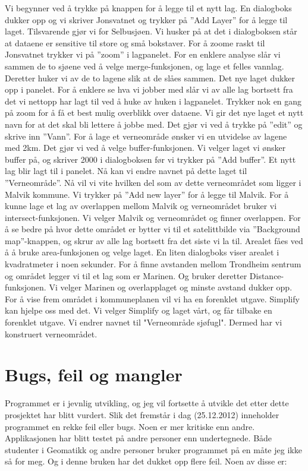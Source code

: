 \documentclass[12pt,twoside,onecolumn]{article}
\begin{document}
	Vi begynner ved å trykke på knappen for å legge til et nytt lag. En dialogboks dukker opp og vi skriver Jonsvatnet og trykker på ''Add Layer'' for å legge til laget. Tilsvarende gjør vi for Selbusjøen. Vi husker på at det i dialogboksen står at dataene er sensitive til store og små bokstaver. For å zoome raskt til Jonsvatnet trykker vi på ''zoom'' i lagpanelet. For en enklere analyse slår vi sammen de to sjøene ved å velge merge-funksjonen, og lage et felles vannlag. Deretter huker vi av de to lagene slik at de slåes sammen. Det nye laget dukker opp i panelet. For å enklere se hva vi jobber med slår vi av alle lag bortsett fra det vi nettopp har lagt til ved å huke av huken i lagpanelet. Trykker nok en gang på zoom for å få et best mulig overblikk over dataene. Vi gir det nye laget et nytt navn for at det skal bli lettere å jobbe med. Det gjør vi ved å trykke på ''edit'' og skrive inn ''Vann''.  For å lage et verneområde ønsker vi en utvidelse av lagene med 2km. Det gjør vi ved å velge buffer-funksjonen. Vi velger laget vi ønsker buffer på, og skriver 2000 i dialogboksen før vi trykker på ''Add buffer''. Et nytt lag blir lagt til i panelet. Nå kan vi endre navnet på dette laget til ''Verneområde''. Nå vil vi vite hvilken del som av dette verneområdet som ligger i Malvik kommune. Vi trykker på ''Add new layer'' for å legge til Malvik. For å kunne lage et lag av overlappen mellom Malvik og verneområdet bruker vi intersect-funksjonen. Vi velger Malvik og verneområdet og finner overlappen. For å se bedre på hvor dette området er bytter vi til et satelittbilde via ''Background map''-knappen, og skrur av alle lag bortsett fra det siste vi la til. Arealet fåes ved å å bruke area-funksjonen og velge laget. En liten dialogboks viser arealet i kvadratmeter i noen sekunder.	For å finne avstanden mellom Trondheim sentrum og området legger vi til et lag som er Marinen. Og bruker deretter Distance-funksjonen. Vi velger Marinen og overlapplaget og minste avstand dukker opp. For å vise frem området i kommuneplanen vil vi ha en forenklet utgave. Simplify kan hjelpe oss med det. Vi velger Simplify og laget vårt, og får tilbake en forenklet utgave. Vi endrer navnet til "Verneområde sjøfugl". Dermed har vi konstruert verneområdet. 
	

\section{Bugs, feil og mangler}

	Programmet er i jevnlig utvikling, og jeg vil fortsette å utvikle det etter dette prosjektet har blitt vurdert. Slik det fremstår i dag (25.12.2012) inneholder programmet en rekke feil eller bugs. Noen er mer kritiske enn andre. Applikasjonen har blitt testet på andre personer enn undertegnede. Både studenter i Geomatikk og andre personer bruker programmet på en måte jeg ikke så for meg. Og i denne bruken har det dukket opp flere feil. Noen av disse er:
	
\end{document}
